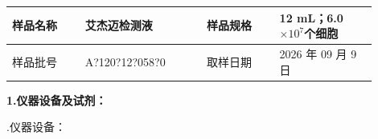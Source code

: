 \documentclass[UTF8,10pt,a4paper,fontset=fandol]{ctexart}
\newcommand{\fieldvalue}[1]{#1}
\newcommand{\handwritten}[1]{#1}
\begin{document}
\noindent
\begin{tabular}{|p{0.18\linewidth}|p{0.30\linewidth}|p{0.18\linewidth}|p{0.24\linewidth}|}
\hline
样品名称 & 艾杰迈检测液 & 样品规格 & 12 mL；6.0$\times 10^7$个细胞\\
\hline
样品批号 &
\fieldvalue{\handwritten{A?120?12?058?0}} &
取样日期 &
\fieldvalue{\handwritten{2026 年 09 月 9 日}}\\
\hline
\end{tabular}

\medskip
\noindent\textbf{1.\quad 仪器设备及试剂：}

.\quad 仪器设备：
\end{document}
